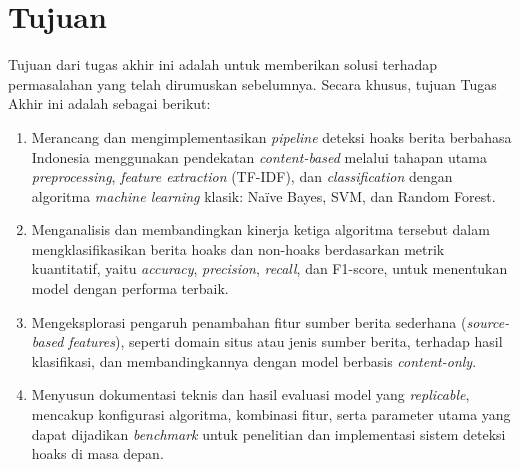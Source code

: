 \section{Tujuan}
Tujuan dari tugas akhir ini adalah untuk memberikan solusi terhadap permasalahan yang telah dirumuskan sebelumnya. Secara khusus, tujuan Tugas Akhir ini adalah sebagai berikut:
\begin{enumerate}
\item Merancang dan mengimplementasikan \textit{pipeline} deteksi hoaks berita berbahasa Indonesia menggunakan pendekatan \textit{content-based} melalui tahapan utama \textit{preprocessing}, \textit{feature extraction} (TF-IDF), dan \textit{classification} dengan algoritma \textit{machine learning} klasik: Naïve Bayes, SVM, dan Random Forest.
\item Menganalisis dan membandingkan kinerja ketiga algoritma tersebut dalam mengklasifikasikan berita hoaks dan non-hoaks berdasarkan metrik kuantitatif, yaitu \textit{accuracy}, \textit{precision}, \textit{recall}, dan F1-score, untuk menentukan model dengan performa terbaik.
\item Mengeksplorasi pengaruh penambahan fitur sumber berita sederhana (\textit{source-based features}), seperti domain situs atau jenis sumber berita, terhadap hasil klasifikasi, dan membandingkannya dengan model berbasis \textit{content-only}.
\item Menyusun dokumentasi teknis dan hasil evaluasi model yang \textit{replicable}, mencakup konfigurasi algoritma, kombinasi fitur, serta parameter utama yang dapat dijadikan \textit{benchmark} untuk penelitian dan implementasi sistem deteksi hoaks di masa depan.
\end{enumerate}
